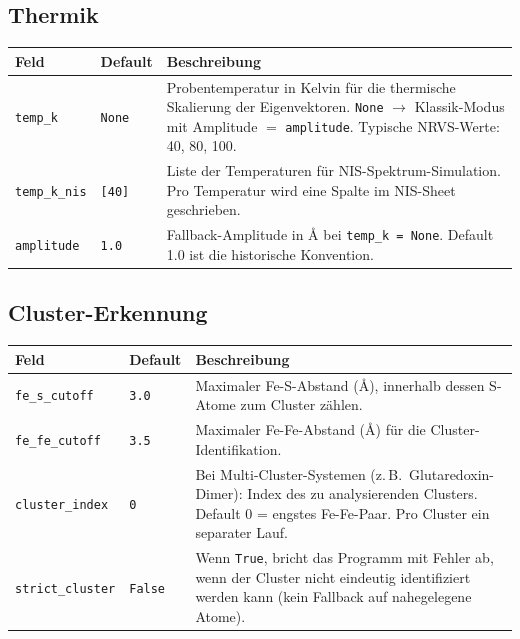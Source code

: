 \documentclass[11pt,a4paper,twoside]{article}
\theoremstyle{remark}
\begin{document}
\subsection{Thermik}

\begin{longtable}{p{} p{} p{}}
\toprule
\textbf{Feld} & \textbf{Default} & \textbf{Beschreibung} \\
\midrule
\endhead
\texttt{temp\_k}       & \texttt{None} & Probentemperatur in Kelvin
  f\"ur die thermische Skalierung der Eigenvektoren. \texttt{None}
  $\to$ Klassik-Modus mit Amplitude $=$ \texttt{amplitude}. Typische
  NRVS-Werte: 40, 80, 100. \\
\texttt{temp\_k\_nis}  & \texttt{[40]} & Liste der Temperaturen f\"ur
  NIS-Spektrum-Simulation. Pro Temperatur wird eine Spalte im NIS-Sheet
  geschrieben. \\
\texttt{amplitude}      & \texttt{1.0}  & Fallback-Amplitude in
  \AA{} bei \texttt{temp\_k = None}. Default 1.0 ist die historische
  Konvention. \\
\bottomrule
\end{longtable}

\subsection{Cluster-Erkennung}

\begin{longtable}{p{} p{} p{}}
\toprule
\textbf{Feld} & \textbf{Default} & \textbf{Beschreibung} \\
\midrule
\endhead
\texttt{fe\_s\_cutoff}  & \texttt{3.0} & Maximaler Fe-S-Abstand (\AA{}),
  innerhalb dessen S-Atome zum Cluster z\"ahlen. \\
\texttt{fe\_fe\_cutoff} & \texttt{3.5} & Maximaler Fe-Fe-Abstand (\AA{})
  f\"ur die Cluster-Identifikation. \\
\texttt{cluster\_index} & \texttt{0}   & Bei Multi-Cluster-Systemen
  (z.\,B.\ Glutaredoxin-Dimer): Index des zu analysierenden Clusters.
  Default 0 = engstes Fe-Fe-Paar. Pro Cluster ein separater Lauf. \\
\texttt{strict\_cluster} & \texttt{False} & Wenn \texttt{True},
  bricht das Programm mit Fehler ab, wenn der Cluster nicht
  eindeutig identifiziert werden kann (kein Fallback auf nahegelegene
  Atome). \\
\bottomrule
\end{longtable}
\end{document}

